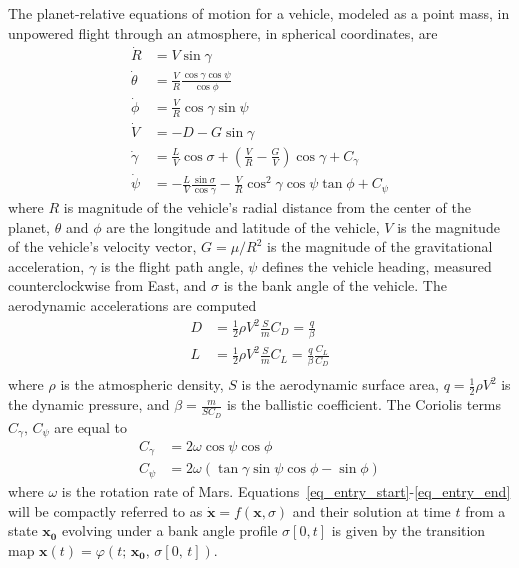 \documentclass[letterpaper, paper,11pt]{AAS}
\begin{document}
The planet-relative equations of motion for a vehicle, modeled as a point mass, in unpowered flight through an atmosphere, in spherical coordinates, are
\begin{align}
\dot{R} &= V\sin\gamma \label{eq_entry_start}\\
\dot{\theta} &= \frac{V}{R}\frac{\cos\gamma\cos\psi}{\cos\phi}\\
\dot{\phi} &= \frac{V}{R}\cos\gamma\sin\psi \\
\dot{V} &= -D - G\sin\gamma \\
\dot{\gamma} &= \frac{L}{V}\cos\sigma + (\frac{V}{R}-\frac{G}{V})\cos\gamma + C_{\gamma}\\
\dot{\psi} &= -\frac{L}{V}\frac{\sin\sigma}{\cos\gamma} - \frac{V}{R}\cos^2\gamma\cos\psi\tan\phi + C_{\psi}\label{eq_entry_end}
\end{align}
where $R$ is magnitude of the vehicle's radial distance from the center of the planet, $\theta$ and $\phi$ are the longitude and latitude of the vehicle, $V$ is the magnitude of the vehicle's velocity vector,  $G=\mu/R^2$ is the magnitude of the gravitational acceleration, $\gamma$ is the flight path angle, $\psi$ defines the vehicle heading, measured counterclockwise from East, and $\sigma$ is the bank angle of the vehicle. The aerodynamic accelerations are computed 
\begin{align}
D &= \frac{1}{2}\rho V^2\frac{S}{m}C_D = \frac{q}{\beta} \\
L &= \frac{1}{2}\rho V^2\frac{S}{m}C_L = \frac{q}{\beta}\frac{C_L}{C_D} \\
\end{align}
where $ \rho $ is the atmospheric density, $S$ is the aerodynamic surface area, $q=\frac{1}{2}\rho V^2$ is the dynamic pressure, and $\beta = \frac{m}{SC_D}$ is the ballistic coefficient.
The Coriolis terms $C_{\gamma},\,C_{\psi}$ are equal to
\begin{align}
C_{\gamma} &= 2\omega\cos\psi\cos\phi \\
C_{\psi} &= 2\omega(\tan\gamma\sin\psi\cos\phi-\sin\phi)
\end{align}
where $\omega$ is the rotation rate of Mars. Equations~\ref{eq_entry_start}-\ref{eq_entry_end} will be compactly referred to as $\dot{\mathbf{x}} = f(\mathbf{x},\sigma)$ and their solution at time $t$ from a state $\mathbf{x_0}$ evolving under a bank angle profile $\sigma[0,t]$ is given by the transition map $\mathbf{x}(t) = \varphi(t;\, \mathbf{x_0},\,\sigma[0,\,t])$.
\end{document}
